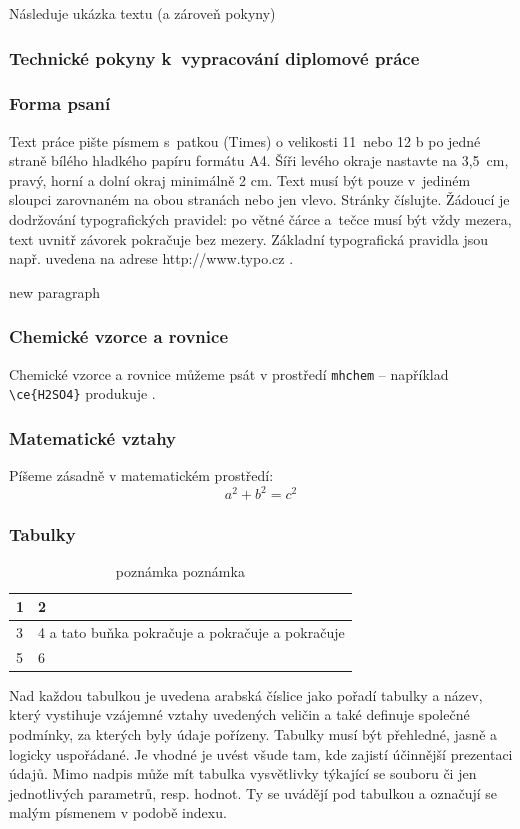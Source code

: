 \documentclass[a4paper, 12pt]{article}
\begin{document}
Následuje ukázka textu (a zároveň pokyny)
\subsubsection{Technické pokyny k~vypracování diplomové práce}
\subsubsection*{Forma psaní}
Text práce pište písmem s~patkou (Times) o velikosti 11~nebo 12 b po jedné straně bílého hladkého papíru formátu A4. Šíři levého okraje nastavte na 3,5~cm, pravý, horní a dolní okraj minimálně 2 cm. Text musí být pouze v~jediném sloupci zarovnaném na obou stranách nebo jen vlevo. Stránky číslujte. Žádoucí je dodržování typografických pravidel: po větné čárce a~tečce musí být vždy mezera, text uvnitř závorek pokračuje bez mezery. Základní typografická pravidla jsou např. uvedena na adrese http://www.typo.cz .

new paragraph

\subsubsection*{Chemické vzorce a rovnice}
Chemické vzorce a rovnice můžeme psát v prostředí \texttt{mhchem} -- například \texttt{\textbackslash{}ce\{H2SO4\}} produkuje .

\subsubsection*{Matematické vztahy}
Píšeme zásadně v matematickém prostředí:
$$ a^2 + b^2 = c^2 $$

\subsubsection*{Tabulky}
\begin{table}[h]
\caption{Toto je název tabulky}
\begin{center}
\begin{tabular}{|l|l|}
\hline
1 & 2\\
\hline
3 & 4 a tato buňka pokračuje a pokračuje a pokračuje \\
5 & 6 \\
\hline
\end{tabular}
\end{center}
\caption*{poznámka poznámka}
\end{table}

Nad každou tabulkou je uvedena arabská číslice jako pořadí tabulky a název, který vystihuje vzájemné vztahy uvedených veličin a také definuje společné podmínky, za kterých byly údaje pořízeny. Tabulky musí být přehledné, jasně a logicky uspořádané. Je vhodné je uvést všude tam, kde zajistí účinnější prezentaci údajů. Mimo nadpis může mít tabulka vysvětlivky týkající se souboru či jen jednotlivých parametrů, resp. hodnot. Ty se uvádějí pod tabulkou a označují se malým písmenem v podobě indexu.
\end{document}
